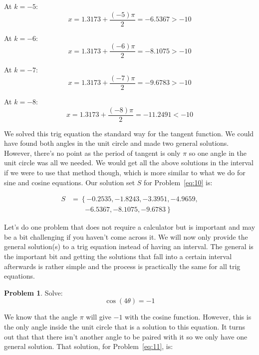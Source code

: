 \documentclass[12pt]{article}
\theoremstyle{definition}
\newtheorem{problem}{Problem}
\begin{document}
At $k=-5$:
\begin{equation}
    x = 1.3173 + \frac{(-5)\pi}{2} = -6.5367 > -10
\end{equation}

At $k=-6$:
\begin{equation}
    x = 1.3173 + \frac{(-6)\pi}{2} = -8.1075 > -10
\end{equation}

At $k=-7$:
\begin{equation}
    x = 1.3173 + \frac{(-7)\pi}{2} = -9.6783 > -10
\end{equation}

At $k=-8$:
\begin{equation}
    x = 1.3173 + \frac{(-8)\pi}{2} = -11.2491 < -10
\end{equation}

We solved this trig equation the standard way for the tangent function.
We could have found both angles in the unit circle and made two general solutions.
However, there's no point as the period of tangent is only $\pi$ so one angle in the unit circle was all we needed.
We would get all the above solutions in the interval if we were to use that method though, which is more similar to what we do for sine and cosine equations.
Our solution set $S$ for Problem~\eqref{eq:10} is:

\begin{equation}
    \begin{aligned}
        S & = \left\{-0.2535, -1.8243, -3.3951, -4.9659, \right. \\
          & \qquad \left. -6.5367, -8.1075, -9.6783 \right\}
    \end{aligned}
\end{equation}

Let's do one problem that does not require a calculator but is important and may be a bit challenging if you haven't come across it.
We will now only provide the general solution(s) to a trig equation instead of having an interval.
The general is the important bit and getting the solutions that fall into a certain interval afterwards is rather simple and the process is practically the same for all trig equations.

\begin{problem}
Solve:
\begin{equation*}
    \cos(4\theta) = -1 \label{eq:11}
\end{equation*}
\end{problem}

We know that the angle $\pi$ will give $-1$ with the cosine function.
However, this is the only angle inside the unit circle that is a solution to this equation.
It turns out that that there isn't another angle to be paired with it so we only have one general solution.
That solution, for Problem~\eqref{eq:11}, is:
\end{document}

